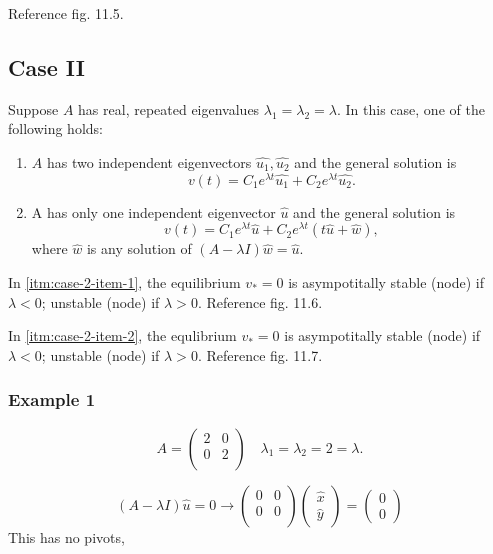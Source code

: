 \documentclass[12pt,twoside]{article}
\begin{document}
Reference fig. 11.5.

\subsection{Case II}
Suppose $A$ has real, repeated eigenvalues $\lambda_1=\lambda_2=\lambda$. In
this case, one of the following holds:
\begin{enumerate}
\item $A$ has two independent eigenvectors $\hat{u_1}, \hat{u_2}$ and the
  general solution is
$$v(t)=C_1e^{\lambda t}\hat{u_1}+C_2e^{\lambda t}\hat{u_2}.$$
\label{itm:case-2-item-1}
\item A has only one independent eigenvector $\hat{u}$ and the general solution
  is $$v(t)=C_1e^{\lambda t}\hat{u}+C_2e^{\lambda t}(t\hat{u}+\hat{w}),$$ where
  $\hat{w}$ is any solution of $(A-\lambda I)\hat{w}=\hat{u}$.
\label{itm:case-2-item-2}
\end{enumerate}

In \cref{itm:case-2-item-1}, the equilibrium $v_*=0$ is asympotitally stable (node)
if $\lambda<0$; unstable (node) if $\lambda>0$. Reference fig. 11.6.

In \cref{itm:case-2-item-2}, the equlibrium $v_*=0$ is asympotitally stable (node)
if $\lambda<0$; unstable (node) if $\lambda>0$. Reference fig. 11.7.

\subsubsection{Example 1}
\begin{equation}
  A =
  \begin{pmatrix}
    2 & 0 \\ 0 & 2 \\
  \end{pmatrix}
\quad \lambda_1 = \lambda_2 = 2 = \lambda.
\end{equation}

\begin{equation}
  (A-\lambda I)\hat{u}=0 \longrightarrow
  \begin{pmatrix}
    0 & 0 \\ 0 & 0 \\
  \end{pmatrix}
  \begin{pmatrix}
    \hat{x} \\ \hat{y}
  \end{pmatrix} =
  \begin{pmatrix}
    0 \\ 0
  \end{pmatrix}
\end{equation}
This has no pivots, 
\end{document}
